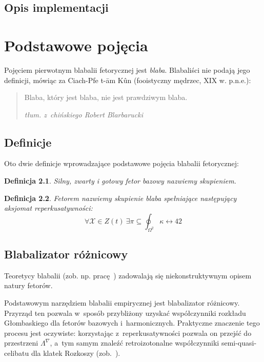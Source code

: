 \documentclass[licencjacka]{pracamgr}
\newtheorem{defi}{Definicja}[section]
\begin{document}
\section{Opis implementacji}


\iffalse
\chapter{Podstawowe pojęcia}\label{r:pojecia}

Pojęciem pierwotnym blabalii fetorycznej jest \emph{blaba}.
Blabaliści nie podają jego definicji, mówiąc za Ciach-Pfe t-\=am
K\^un (fooistyczny mędrzec, XIX w. p.n.e.):
\begin{quote}
  Blaba, który jest blaba, nie jest prawdziwym blaba.

\raggedleft\slshape tłum. z~chińskiego Robert Blarbarucki
\end{quote}

\section{Definicje}

Oto dwie definicje wprowadzające podstawowe pojęcia blabalii
fetorycznej:

\begin{defi}\label{skupienie}
  Silny, zwarty i gotowy fetor bazowy nazwiemy \emph{skupieniem}.
\end{defi}

\begin{defi}\label{fetor}
  \emph{Fetorem} nazwiemy skupienie blaba spełniające następujący
  \emph{aksjomat reperkusatywności}:
  $$\forall \mathcal{X}\in Z(t)\ \exists
  \pi\subseteq\oint_{\Omega^2}\kappa\leftrightarrow 42$$
\end{defi}


\section{Blabalizator różnicowy}

Teoretycy blabalii (zob. np. pracę~\cite{grglo}) zadowalają się
niekonstruktywnym opisem natury fetorów.

Podstawowym narzędziem blabalii empirycznej jest blabalizator
różnicowy.  Przyrząd ten pozwala w~sposób przybliżony uzyskać
współczynniki rozkładu Głombaskiego dla fetorów bazowych
i~harmonicznych.  Praktyczne znaczenie tego procesu jest oczywiste:
korzystając z~reperkusatywności pozwala on przejść do przestrzeni
$\Lambda^{\nabla}$, a~tym samym znaleźć retroizotonalne współczynniki
semi-quasi-celibatu dla klatek Rozkoszy (zob.~\cite{JR}).
\end{document}

